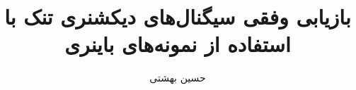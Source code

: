 \documentclass{beamer}
\begin{document}
\title{بازیابی وفقی سیگنال‌های دیکشنری تنک با استفاده از نمونه‌های باینری}
\subtitle{}
\author{حسین بهشتی}


\begin{frame}
\maketitle
\end{frame}


\end{document}
